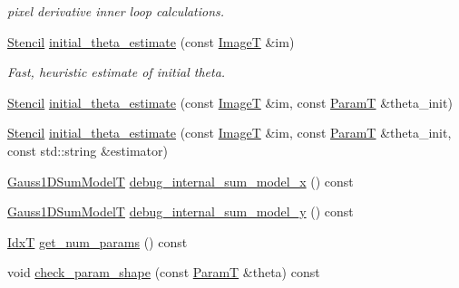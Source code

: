 \begin{DoxyCompactItemize}
\begin{DoxyCompactList}\small\item\em pixel derivative inner loop calculations. \end{DoxyCompactList}\item 
\hyperlink{classmappel_1_1Gauss2DsModel_1_1Stencil}{Stencil} \hyperlink{classmappel_1_1Gauss2DsModel_a86bc63141107624bf3ca7016a570e994}{initial\+\_\+theta\+\_\+estimate} (const \hyperlink{classmappel_1_1ImageFormat2DBase_a667ea5016648958e507e7db8eaa041b0}{ImageT} \&im)
\begin{DoxyCompactList}\small\item\em Fast, heuristic estimate of initial theta. \end{DoxyCompactList}\item 
\hyperlink{classmappel_1_1Gauss2DsModel_1_1Stencil}{Stencil} \hyperlink{classmappel_1_1Gauss2DsModel_a0de2129889e9c5d5ff294da9be5a890b}{initial\+\_\+theta\+\_\+estimate} (const \hyperlink{classmappel_1_1ImageFormat2DBase_a667ea5016648958e507e7db8eaa041b0}{ImageT} \&im, const \hyperlink{classmappel_1_1PointEmitterModel_a665ec6aea3aac139bb69a23c06d4b9a1}{ParamT} \&theta\+\_\+init)
\item 
\hyperlink{classmappel_1_1Gauss2DsModel_1_1Stencil}{Stencil} \hyperlink{classmappel_1_1Gauss2DsModel_a70e079fd6b31bc6af5b7c10d2a0d8fb5}{initial\+\_\+theta\+\_\+estimate} (const \hyperlink{classmappel_1_1ImageFormat2DBase_a667ea5016648958e507e7db8eaa041b0}{ImageT} \&im, const \hyperlink{classmappel_1_1PointEmitterModel_a665ec6aea3aac139bb69a23c06d4b9a1}{ParamT} \&theta\+\_\+init, const std\+::string \&estimator)
\item 
\hyperlink{classmappel_1_1Gauss2DsModel_a23ae68443a62f76405e6f08f6dec4fb7}{Gauss1\+D\+Sum\+ModelT} \hyperlink{classmappel_1_1Gauss2DsModel_a94ce8fb5e93ba7607f75090e1fe9fe7e}{debug\+\_\+internal\+\_\+sum\+\_\+model\+\_\+x} () const 
\item 
\hyperlink{classmappel_1_1Gauss2DsModel_a23ae68443a62f76405e6f08f6dec4fb7}{Gauss1\+D\+Sum\+ModelT} \hyperlink{classmappel_1_1Gauss2DsModel_a2ce4737beb88367daeb480bf471ad2cf}{debug\+\_\+internal\+\_\+sum\+\_\+model\+\_\+y} () const 
\item 
\hyperlink{namespacemappel_ab17ec0f30b61ece292439d7ece81d3a8}{IdxT} \hyperlink{classmappel_1_1PointEmitterModel_a6fe8129bd24ab5c6620b3ab106b6c91a}{get\+\_\+num\+\_\+params} () const 
\item 
void \hyperlink{classmappel_1_1PointEmitterModel_a97a868e842302f670ed9f9bd49416771}{check\+\_\+param\+\_\+shape} (const \hyperlink{classmappel_1_1PointEmitterModel_a665ec6aea3aac139bb69a23c06d4b9a1}{ParamT} \&theta) const 

\end{DoxyCompactItemize}
